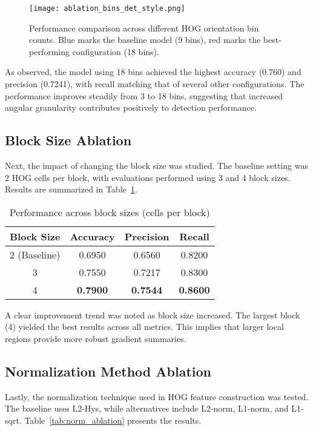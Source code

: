 \documentclass[10pt, onecolumn, a4paper]{article}
\begin{document}
\begin{figure}[H]
    \centering
    \texttt{[image: ablation\_bins\_det\_style.png]}
    \caption{\small Performance comparison across different HOG orientation bin counts. Blue marks the baseline model (9 bins), red marks the best-performing configuration (18 bins).}
    \label{fig:bins_ablation}
\end{figure}
\vspace{-1.5em}
As observed, the model using 18 bins achieved the highest accuracy (0.760) and precision (0.7241), with recall matching that of several other configurations. 
The performance improves steadily from 3 to 18 bins, suggesting that increased angular granularity contributes positively to detection performance.

\subsection{Block Size Ablation}
\vspace{-0.5em}
Next, the impact of changing the block size was studied. The baseline setting was 2 HOG cells per block, 
with evaluations performed using 3 and 4 block sizes. Results are summarized in Table~\ref{tab:blocksize_ablation}.

\begin{table}[H]
\centering
\caption{\small Performance across block sizes (cells per block)}
\begin{tabular}{|c|c|c|c|}
\hline
\textbf{Block Size} & \textbf{Accuracy} & \textbf{Precision} & \textbf{Recall} \\
\hline
2\texttimes2 (Baseline) & 0.6950 & 0.6560 & 0.8200 \\
3\texttimes3 & 0.7550 & 0.7217 & 0.8300 \\
4\texttimes4 & \textbf{0.7900} & \textbf{0.7544} & \textbf{0.8600} \\
\hline
\end{tabular}
\label{tab:blocksize_ablation}
\end{table}

A clear improvement trend was noted as block size increased. The largest block (4) yielded the best results across all metrics. 
This implies that larger local regions provide more robust gradient summaries.

\subsection{Normalization Method Ablation}
\vspace{-0.5em}
Lastly, the normalization technique used in HOG feature construction was tested. 
The baseline uses L2-Hys, while alternatives include L2-norm, L1-norm, and L1-sqrt. Table~\ref{tab:norm_ablation} presents the results.
\end{document}

